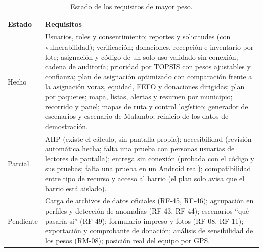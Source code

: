 \begin{table}[H]
\centering
\caption{Estado de los requisitos de mayor peso.}
\begin{tabularx}{\textwidth}{@{}p{4.2cm}X@{}}
\toprule
\textbf{Estado} & \textbf{Requisitos} \\
\midrule
Hecho & Usuarios, roles y consentimiento; reportes y solicitudes (con vulnerabilidad); verificación; donaciones, recepción e inventario por lote; asignación y código de un solo uso validado sin conexión; cadena de auditoría; prioridad por TOPSIS con pesos ajustables y confianza; plan de asignación optimizado con comparación frente a la asignación voraz, equidad, FEFO y donaciones dirigidas; plan por paquetes; mapa, listas, alertas y resumen por municipio; recorrido y panel; mapas de ruta y control logístico; generador de escenarios y escenario de Malambo; reinicio de los datos de demostración. \\
Parcial & AHP (existe el cálculo, sin pantalla propia); accesibilidad (revisión automática hecha; falta una prueba con personas usuarias de lectores de pantalla); entrega sin conexión (probada con el código y sus pruebas; falta una prueba en un Android real); compatibilidad entre tipo de recurso y acceso al barrio (el plan solo avisa que el barrio está aislado). \\
Pendiente & Carga de archivos de datos oficiales (RF-45, RF-46); agrupación en perfiles y detección de anomalías (RF-43, RF-44); escenarios ``qué pasaría si'' (RF-49); formulario impreso y fotos (RF-08, RF-11); exportación y comprobante de donación; análisis de sensibilidad de los pesos (RM-08); posición real del equipo por GPS. \\
\bottomrule
\end{tabularx}
\end{table}


